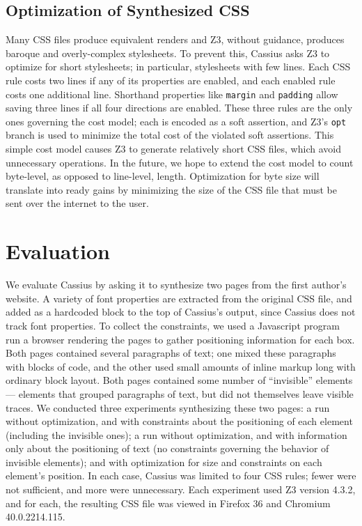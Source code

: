 \documentclass[10pt]{sigplanconf}
\newcommand{\name}{Cassius\xspace}
\begin{document}
\subsection{Optimization of Synthesized CSS}

Many CSS files produce equivalent renders and Z3, without guidance,
  produces baroque and overly-complex stylesheets.
To prevent this, \name asks Z3 to optimize for short stylesheets;
  in particular, stylesheets with few lines.
Each CSS rule costs two lines if any of its properties are enabled,
  and each enabled rule costs one additional line.
Shorthand properties like \texttt{margin} and \texttt{padding}
  allow saving three lines if all four directions are enabled.
These three rules are the only ones governing the cost model;
  each is encoded as a soft assertion, and Z3's \texttt{opt} branch
  is used to minimize the total cost of the violated soft assertions.
This simple cost model causes Z3 to generate relatively short CSS files,
  which avoid unnecessary operations.
In the future, we hope to extend the cost model
  to count byte-level, as opposed to line-level, length.
Optimization for byte size will translate into ready gains
  by minimizing the size of the CSS file
  that must be sent over the internet to the user.

\section{Evaluation}

We evaluate \name by asking it to synthesize two pages
  from the first author's website.
A variety of font properties are extracted from the original CSS file,
  and added as a hardcoded block to the top of \name's output,
  since \name does not track font properties.
To collect the constraints, we used a Javascript program
  run a browser rendering the pages
  to gather positioning information for each box.
Both pages contained several paragraphs of text;
  one mixed these paragraphs with blocks of code,
  and the other used small amounts of inline markup
  long with ordinary block layout.
Both pages contained some number of ``invisible'' elements---%
  elements that grouped paragraphs of text,
  but did not themselves leave visible traces.
We conducted three experiments synthesizing these two pages:
  a run without optimization,
  and with constraints about the positioning of each element
  (including the invisible ones);
  a run without optimization,
  and with information only about the positioning of text
  (no constraints governing the behavior of invisible elements);
  and with optimization for size and constraints
  on each element's position.
In each case, \name was limited to four CSS rules;
  fewer were not sufficient, and more were unnecessary.
Each experiment used Z3 version 4.3.2, and for each,
  the resulting CSS file was viewed in Firefox 36
  and Chromium 40.0.2214.115.
\end{document}
